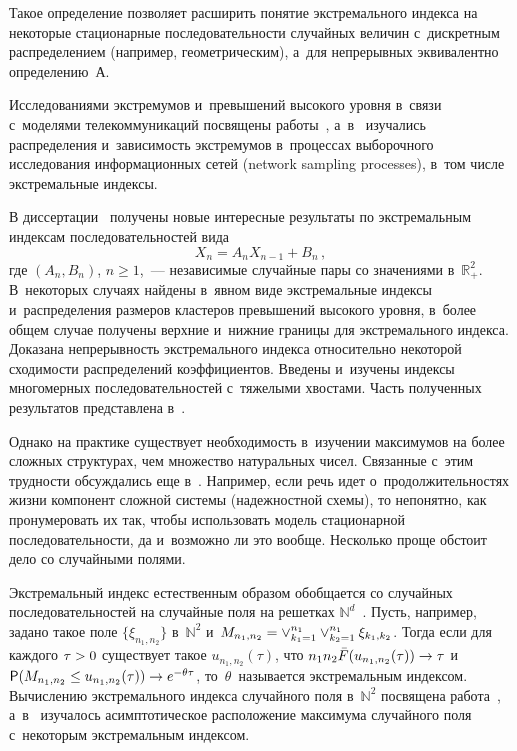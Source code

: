 \begin{multicols}{2}
\smallskip


Такое определение позволяет расширить понятие экстремального индекса на некоторые стационарные
последовательности случайных величин с~дискретным распределением (например, геометриче\-ским),
а~для непрерывных эквивалентно определению~А.

Исследованиями экстремумов и~превышений высокого уровня в~связи с~моделями телекоммуникаций
посвящены работы~\cite{Markovich1, Markovich2},
а~в~\cite{Markovich-new} изучались распределения и~зависимость экстремумов в~процессах
выборочного исследования информационных сетей (network sampling processes), в~том числе
экстремальные индексы.

В диссертации~\cite{Gold} получены новые интересные результаты по экстремальным индексам
последовательностей вида
$$
X_n=A_nX_{n-1}+B_n\,,
$$
где $(A_n,B_n)$, $n\ge 1$,~--- независимые случайные пары со значениями
в~$\mathbb{R}_+^2$. В~некоторых
случаях найдены в~явном виде экстремальные индексы и~распределения размеров кластеров превышений
высокого уровня, в~более общем случае получены верхние и~нижние границы для экстремального индекса.
Доказана непрерывность экстремального индекса относительно некоторой сходимости распределений
коэффициентов. Введены и~изучены индексы многомерных последовательностей с~тяжелыми хвостами.
Часть полученных результатов представлена в~\cite{Gold1, Gold2}.

Однако на практике существует необходимость в~изучении максимумов на более сложных структурах,
чем множество натуральных чисел. Связанные с~этим трудности обсуждались еще в~\cite[\S 3.9, \S 3.12]{Gal}.
Например, если речь идет о~продолжительностях жизни компонент сложной системы (надежностной схемы),
то непонятно, как пронумеровать их так, чтобы использовать модель стационарной последовательности, да
и~возможно ли это вообще. Несколько проще обстоит дело со случайными полями.

Экстремальный индекс естественным образом обобщается со случайных последовательностей на случайные
поля на решетках $\mathbb{N}^d$~\cite{Choi}. Пусть, например, задано
такое поле $\{\xi_{n_1,n_2}\}$ в~$\mathbb{N}^2$ и~$M_{n_1,n_2}\hm=\vee_{k_1=1}^{n_1}\vee_{k_2=1}^{n_1}\xi_{k_1,k_2}$.
Тогда если для каждого $\tau\hm>0$
существует такое $u_{n_1,n_2}(\tau)$, что $n_1n_2{\bar F}(u_{n_1,n_2}(\tau))\hm\to
\tau$ и~${\sf P}(M_{n_1,n_2}\hm\le u_{n_1,n_2}(\tau))\hm\to e^{-\theta\tau}$,
то~$\theta$~называется экстремальным индексом.
Вычислению экстремального индекса случайного поля в~$\mathbb{N}^2$ посвящена работа~\cite{Exp1},
а~в~\cite{Exp2} изучалось асимптотическое расположение максимума случайного поля с~некоторым
экстремальным индексом.


\end{multicols}
